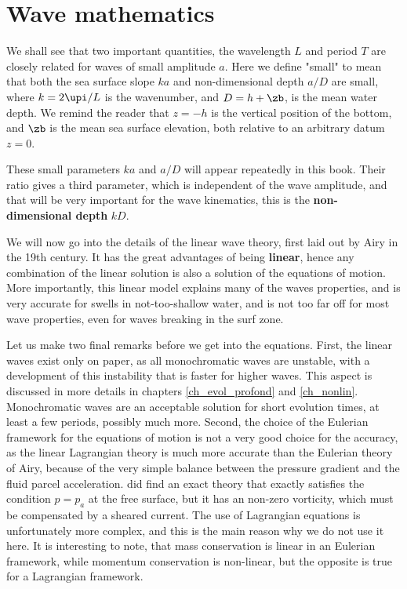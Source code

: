 \section{Wave mathematics}
We shall see that two important quantities, the wavelength $L$ and period $T$ are closely related 
for waves of small amplitude $a$. Here we define "small" to  mean that both the sea surface slope $ka$ and non-dimensional depth $a/D$ are small, 
where $k=2\upi/L$ is the wavenumber, and $D=h+\zb$, is the mean water depth. We remind the reader that $z=-h$
is the vertical position of the bottom, and $\zb$ is the mean sea surface elevation, both relative to an arbitrary datum 
$z=0$.

These small parameters $ka$ and $a/D$ will appear repeatedly in this book. Their ratio gives a third parameter, which is independent 
of the wave amplitude, and that will be very important for the wave kinematics, this is the 
\textbf{non-dimensional depth} $kD$.

We will now go into the details of the linear wave theory, first 
laid out by Airy in the 19th century. It has the great advantages of being  \textbf{linear}, hence any combination of the 
linear solution is also a solution of the equations of motion. More importantly, this linear model explains many of the waves properties, 
and is very accurate for swells in not-too-shallow water, and is not too far off for most wave properties, even for waves 
breaking in the surf zone.  

Let us make two final remarks before we get into the equations. 
First, the linear waves exist only on paper, as all monochromatic waves are unstable, with a development of this instability 
that is faster for higher waves. This aspect is discussed in more details in chapters \ref{ch_evol_profond} and \ref{ch_nonlin}. 
Monochromatic waves are an acceptable solution for short evolution times, at least a few periods, possibly much more. Second, 
the choice of the Eulerian framework for the equations of motion
is not a very good choice for the accuracy, as the linear Lagrangian theory 
is much more accurate than the Eulerian theory of Airy, because of the very simple balance between the pressure gradient and the 
fluid parcel acceleration.  
\cite{vonGerstner1809} did find an exact theory that exactly satisfies the condition $p=p_a$ at the free surface, 
but it has an non-zero vorticity, which must be compensated by a sheared current. 
The use of Lagrangian equations is unfortunately 
more complex, and this is the main reason why we do not use it here. It is interesting to note, that 
mass conservation is linear in an Eulerian framework, 
while momentum conservation is non-linear, but the opposite is true for a Lagrangian framework. 

